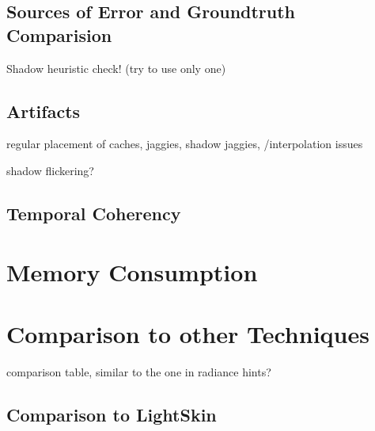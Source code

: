 \documentclass[thesis.tex]{subfiles}
\begin{document}
\subsection{Sources of Error and Groundtruth Comparision}
Shadow heuristic check! (try to use only one)

\subsection{Artifacts}
regular placement of caches, jaggies,
shadow jaggies,
/interpolation issues

shadow flickering?

\subsection{Temporal Coherency}


\section{Memory Consumption}

\section{Comparison to other Techniques} \label{sec:eva:comparisiontoother}

comparison table, similar to the one in radiance hints?

\subsection{Comparison to LightSkin}

\subfilebib %
\end{document}
